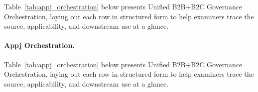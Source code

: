 {\tablestripes\tablefontsize

\noindent Table~\ref{tab:appj_orchestration} below presents Unified B2B+B2C Governance Orchestration, laying out each row in structured form to help examiners trace the source, applicability, and downstream use at a glance. %
\paragraph{Appj Orchestration.} %
\noindent Table~\ref{tab:appj_orchestration} below presents Unified B2B+B2C Governance Orchestration, laying out each row in structured form to help examiners trace the source, applicability, and downstream use at a glance. %



}
